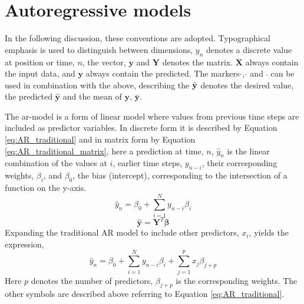 \section{Autoregressive models} \label{sec:ARmodels}
In the following discussion, these conventions are adopted. Typographical emphasis is used to distinguish between dimensions, $y_n$ denotes a discrete value at position or time, $n$, the vector, $\mathbf{y}$ and $\mathbf{Y}$ denotes the matrix. $\mathbf{X}$ always contain the input data, and $\mathbf{y}$ always contain the predicted. The markers $\tilde{ }$, $\hat{ }$ and $\bar{ }$ can be used in combination with the above, describing the $\Tilde{\mathbf{y}}$ denotes the desired value, the predicted $\hat{\mathbf{y}}$ and the mean of $\mathbf{y}$, $\bar{\mathbf{y}}$.


The \acrshort{ar}-model is a form of linear model where values from previous time steps are included as predictor variables. In discrete form it is described by Equation \eqref{eq:AR_traditional} and in matrix form by Equation \eqref{eq:AR_traditional_matrix}, here a prediction at time, $n$, $\hat{y}_n$ is the linear combination of the values at $i$, earlier time steps, $y_{n-i}$, their corresponding weights, $\beta_i$, and $\beta_0$, the bias (intercept), corresponding to the intersection of a function on the y-axis. 
\begin{equation} \label{eq:AR_traditional}
    \hat{y}_n = \beta_0 + \sum_{i = 1}^{N} y_{n-i} \beta_{i}
\end{equation}
\begin{equation} \label{eq:AR_traditional_matrix}
    \hat{\mathbf{y}} = \mathbf{Y}^T \mathbf{\beta}
\end{equation}
Expanding the traditional AR model to include other predictors, $x_i$, yields the expression,
\begin{equation} \label{eq:AR_expression}
    \hat{y}_n = \beta_0 + \sum_{i = 1}^{N} y_{n-i}\beta_{i}+ \sum_{j=1}^p x_j\beta_{j+p}
\end{equation}
Here $p$ denotes the number of predictors, $\beta_{j+p}$ is the corresponding weights. The other symbols are described above referring to Equation \eqref{eq:AR_traditional}. 

